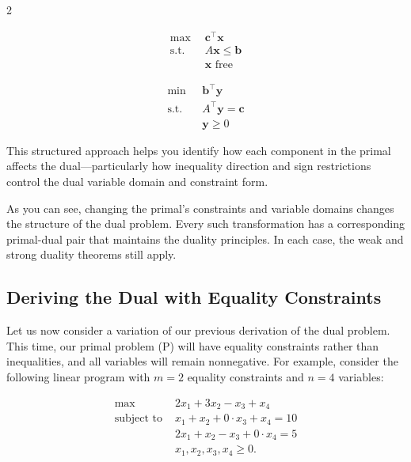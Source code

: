 \begin{multicols}{2}
\begin{tcolorbox}[title=Primal (P), colback=blue!5, colframe=blue!40!black]
\[
\begin{aligned}
\max\ & \mathbf{c}^\top \mathbf{x} \\
\text{s.t.} \quad & A \mathbf{x} \leq \mathbf{b} \\
& \mathbf{x} \text{ free}
\end{aligned}
\]
\end{tcolorbox}

\columnbreak

\begin{tcolorbox}[title=Dual (D), colback=green!5, colframe=green!40!black]
\[
\begin{aligned}
\min\ & \mathbf{b}^\top \mathbf{y} \\
\text{s.t.} \quad & A^\top \mathbf{y} = \mathbf{c} \\
& \mathbf{y} \geq 0
\end{aligned}
\]
\end{tcolorbox}
\end{multicols}

\bigskip

This structured approach helps you identify how each component in the primal affects the dual—particularly how inequality direction and sign restrictions control the dual variable domain and constraint form.


As you can see, changing the primal’s constraints and variable domains changes the structure of the dual problem. Every such transformation has a corresponding primal-dual pair that maintains the duality principles. In each case, the weak and strong duality theorems still apply.


\subsection*{Deriving the Dual with Equality Constraints}

Let us now consider a variation of our previous derivation of the dual problem. This time, our primal problem (P) will have equality constraints rather than inequalities, and all variables will remain nonnegative. For example, consider the following linear program with $m=2$ equality constraints and $n=4$ variables:

\[
\begin{aligned}
\max \; & 2x_1 + 3x_2 - x_3 + x_4 \\
\text{subject to } & x_1 + x_2 + 0 \cdot x_3 + x_4 = 10 \\
& 2x_1 + x_2 - x_3 + 0 \cdot x_4 = 5 \\
& x_1, x_2, x_3, x_4 \geq 0.
\end{aligned}
\]

